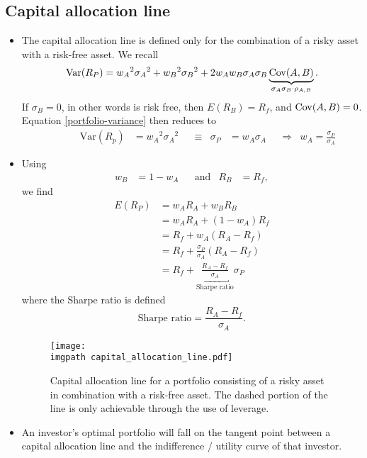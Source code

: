 \documentclass[../notes_compiled.tex]{subfiles}
\begin{document}
\subsection{Capital allocation line}
\begin{itemize}
\item The capital allocation line is defined only for the combination of a risky asset with a risk-free asset. We recall
\begin{equation}
\text{Var}(R_{P}) = {w_{A}}^{2}{\sigma_{A}}^{2} + {w_{B}}^{2}{\sigma_{B}}^{2} + 2w_{A}w_{B}\sigma_{A}\sigma_{B}\underbrace{\operatorname{Cov}(A,B)}_{\sigma_{A}\sigma_{B}\cdot\rho_{A,B}}. \label{portfolio-variance}
\end{equation}
If $\sigma_{B}=0$, in other words is risk free, then $E(R_{B})=R_{f}$, and $\operatorname{Cov}(A,B)=0$. Equation \ref{portfolio-variance} then reduces to
\begin{align}
&&&&&& \text{Var}(R_{p}) &= {w_{A}}^{2}{\sigma_{A}}^{2} & &\equiv & \sigma_{P}&=w_{A}\sigma_{A} &  &\Rightarrow & w_{A} = \frac{\sigma_{P}}{\sigma_{A}}&&
\end{align}
\item Using
\begin{align*}
&&w_{B} &= 1 - w_{A} & &\text{and} & R_{B} &= R_{f}, &&
\end{align*}
we find
\begin{align}
E(R_{P})&=w_{A}R_{A} + w_{B}R_{B} \nonumber \\
&=w_{A}R_{A} + (1-w_{A})R_{f} \nonumber \\
&=R_{f} + w_{A}(R_{A}-R_{f}) \nonumber \\
&=R_{f} + \frac{\sigma_{P}}{\sigma_{A}}(R_{A}-R_{f}) \nonumber \\
&=R_{f} + \underbracket{\frac{R_{A} - R_{f}}{\sigma_{A}}}_{\text{Sharpe ratio}}\sigma_{P} \
\end{align}
where the Sharpe ratio is defined
\begin{equation}
\text{Sharpe ratio} = \frac{R_{A} - R_{f}}{\sigma_{A}}. \label{sharpe}
\end{equation}
\vspace{-.7cm}
\begin{figure}[h]
  \centering
  \texttt{[image: \\imgpath capital\_allocation\_line.pdf]}
  \caption{Capital allocation line for a portfolio consisting of a risky asset in combination with a risk-free asset. The dashed portion of the line is only achievable through the use of leverage.}
\end{figure}
\item An investor’s optimal portfolio will fall on the tangent point between a capital allocation line and the indifference / utility curve of that investor.

\end{itemize}
\end{document}
